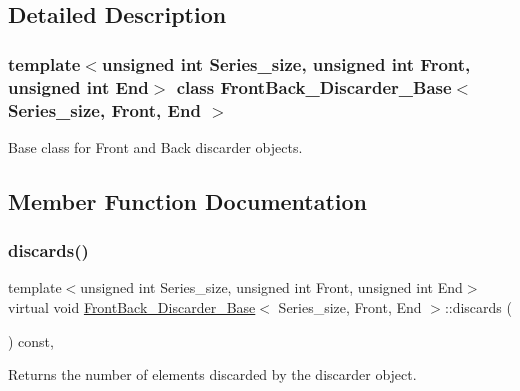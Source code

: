 \subsection{Detailed Description}
\subsubsection*{template$<$unsigned int Series\+\_\+size, unsigned int Front, unsigned int End$>$\newline
class Front\+Back\+\_\+\+Discarder\+\_\+\+Base$<$ Series\+\_\+size, Front, End $>$}

Base class for Front and Back discarder objects. 

\subsection{Member Function Documentation}
\mbox{\label{classFrontBack__Discarder__Base_a9cc129dd2be2f0894646a3db2aa2bebc}} 
\subsubsection{\texorpdfstring{discards()}{discards()}}
{\footnotesize\ttfamily template$<$unsigned int Series\+\_\+size, unsigned int Front, unsigned int End$>$ \\
virtual void \hyperlink{classFrontBack__Discarder__Base}{Front\+Back\+\_\+\+Discarder\+\_\+\+Base}$<$ Series\+\_\+size, Front, End $>$\+::discards (\begin{DoxyParamCaption}{ }\end{DoxyParamCaption}) const\hspace{0.3cm}{\ttfamily [inline]}, {\ttfamily [virtual]}}



Returns the number of elements discarded by the discarder object. 

\mbox{\label{classFrontBack__Discarder__Base_ab8a1d0082f223c31da3c1374c520c4c4}} 
